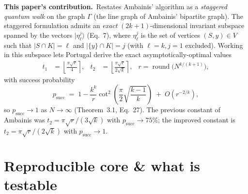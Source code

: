 \documentclass[11pt]{article}
\begin{document}
\textbf{This paper's contribution.}\ Restates Ambainis' algorithm as a
\emph{staggered quantum walk} on the graph $\Gamma$ (the line graph of
Ambainis' bipartite graph). The staggered formulation admits an
\emph{exact} $(2k+1)$-dimensional invariant subspace spanned by the vectors
$|\eta_\ell^j\rangle$ (Eq.~7), where $\eta_\ell^j$ is the set of vertices
$(S,y) \in V$ such that $|S \cap K| = \ell$ and $|\{y\} \cap K| = j$
(with $\ell = k, j = 1$ excluded). Working in this subspace lets Portugal
derive the exact asymptotically-optimal values
\begin{align}
    t_1 &= \left\lfloor \frac{\pi \sqrt{r}}{4} \right\rceil, &
    t_2 &= \left\lfloor \frac{\pi \sqrt{r}}{2\sqrt{k}} \right\rceil,
    & r = \operatorname{round}\!\big(N^{k/(k+1)}\big),
\end{align}
with success probability
\[
    p_{\text{succ}} \;=\; 1 - \frac{k^k}{r} \cot^2\!\left(\frac{\pi}{2}\sqrt{\frac{k-1}{k}}\right)
                                \;+\; O(r^{-2/k}),
\]
so $p_{\text{succ}} \to 1$ as $N \to \infty$ (Theorem~3.1, Eq.~27). The
previous constant of Ambainis was $t_2 = \pi\sqrt{r}/(3\sqrt{k})$ with
$p_{\text{succ}} \to 75\%$; the improved constant is $t_2 = \pi\sqrt{r}/(2\sqrt{k})$
with $p_{\text{succ}} \to 1$.

\section{Reproducible core \& what is testable}
\label{sec:testable}
\end{document}
